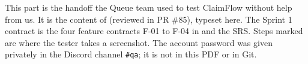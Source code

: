 This part is the handoff the Queue team used to test ClaimFlow without help from us.
It is the content of  (reviewed in PR \#85), typeset here.
The Sprint 1 contract is the four feature contracts F-01 to F-04 in  and the SRS.
Steps marked \shot{} are where the tester takes a screenshot.
The account password was given privately in the Discord channel \texttt{\#qa}; it is not in this PDF or in Git.
